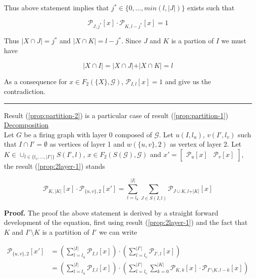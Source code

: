 \documentclass[a4paper, 11pt]{article}
\begin{document}
Thus above statement implies that $j^{*} \in \{0, \ldots, min(l, \vert J \vert)\}$ exists such that  

\begin{equation*}
\mathcal{P}_{J, j^{*}}\left[ x \right]  \cdot \mathcal{P}_{K, l - j^{*}}\left[ x \right] = 1
\end{equation*}

Thus $\vert X \cap J \vert = j^{*}$ and $\vert X \cap K \vert = l - j^{*}$. Since $J$ and $K$ is a partion of $I$ we must have

\begin{equation*}
\vert X \cap I \vert = \vert X \cap J \vert + \vert X \cap K \vert = l
\end{equation*}

As a consequence for $x \in F_2(\{X\}, \mathcal{G})$, $\mathcal{P}_{I,l} \left[ x \right] = 1$ and give us the contradiction. 
\begin{center}
\rule[0pt]{100pt}{1pt} 
\end{center}

Result (\ref{prop:partition-2}) is a particular case of result (\ref{prop:partition-1})\\

\underline{Decomposition}\\

Let $G$ be a firing graph with layer 0 composed of $\mathcal{G}$. Let $u(I, l_u)$, $v(I', l_v)$ such that $I \cap I' = \emptyset$ as vertices of layer 1 and $w(\{ u, v \}, 2)$ as vertex of layer 2. Let $K \in \cup_{l \in \{l_v, \ldots, \vert I' \vert \}} S(I', l)$, $x \in F_2(S(\mathcal{G}), \mathcal{G})$ and $x' = \begin{bmatrix} \mathcal{P}_{u}[x] &\mathcal{P}_{v}[x] \end{bmatrix}$, the result (\ref{prop:2layer-1}) stands

\begin{equation*}
\mathcal{P}_{K, \vert K \vert}\left[ x \right] \cdot \mathcal{P}_{\{u, v\}, 2}\left[ x' \right] = \sum_{l=l_u}^{\vert I \vert}  \sum_{J \in S(I, l)} \mathcal{P}_{J \cup K, l + \vert K \vert }\left[ x \right]
\end{equation*}

\textbf{Proof.} The proof the above statement is derived by a straight forward development of the equation, first using result (\ref{prop:2layer-1}) and the fact that $K$ and $I' \setminus K$ is a partition of $I'$ we can write 

\begin{align*}
\mathcal{P}_{\{u, v\}, 2} \left[ x' \right] &= \left( \sum_{l=l_u}^{\vert I \vert} \mathcal{P}_{I, l} \left[ x \right] \right) \cdot \left( \sum_{l=l_v}^{\vert I' \vert} \mathcal{P}_{I', l}\left[ x \right] \right) \\
&= \left( \sum_{l=l_u}^{\vert I \vert} \mathcal{P}_{I, l}\left[ x \right] \right) \cdot \left( \sum_{l=l_v}^{\vert I' \vert}  \sum_{k=0}^{\vert K \vert} \mathcal{P}_{K, k}\left[ x \right] \cdot \mathcal{P}_{I' \setminus K , l-k}\left[ x \right] \right) \\
\end{align*}
\end{document}
